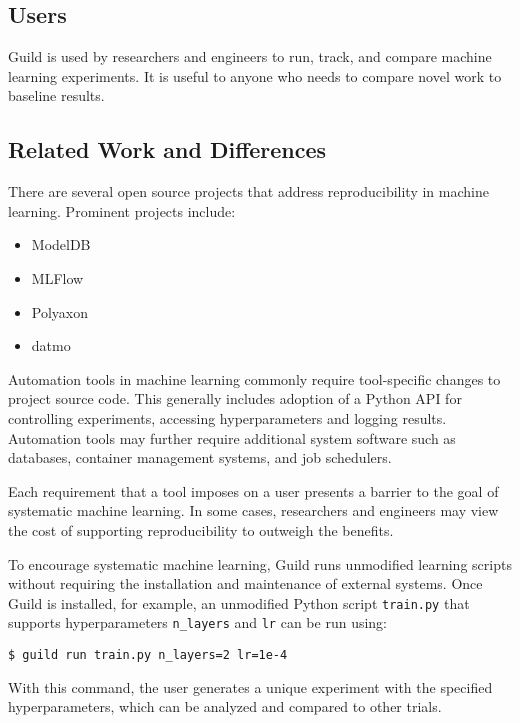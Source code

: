 \documentclass{article}
\begin{document}
\subsection{Users}

Guild is used by researchers and engineers to run, track, and compare
machine learning experiments. It is useful to anyone who needs to
compare novel work to baseline results.

\subsection{Related Work and Differences}

There are several open source projects that address reproducibility in
machine learning. Prominent projects include:

\begin{itemize}[noitemsep, topsep=0pt, partopsep=0pt]
\item ModelDB \cite{modeldb}
\item MLFlow \cite{mlflow}
\item Polyaxon \cite{polyaxon}
\item datmo \cite{datmo}
\end{itemize}

Automation tools in machine learning commonly require tool-specific
changes to project source code. This generally includes adoption of a
Python API for controlling experiments, accessing hyperparameters and
logging results. Automation tools may further require additional
system software such as databases, container management systems, and
job schedulers.

Each requirement that a tool imposes on a user presents a barrier to
the goal of systematic machine learning. In some cases, researchers
and engineers may view the cost of supporting reproducibility to
outweigh the benefits.

To encourage systematic machine learning, Guild runs unmodified
learning scripts without requiring the installation and maintenance of
external systems. Once Guild is installed, for example, an unmodified
Python script \texttt{train.py} that supports hyperparameters
\texttt{n\_layers} and \texttt{lr} can be run using:

{\footnotesize
\begin{verbatim}
$ guild run train.py n_layers=2 lr=1e-4
\end{verbatim}}

With this command, the user generates a unique experiment with the
specified hyperparameters, which can be analyzed and compared to other
trials.
\end{document}
